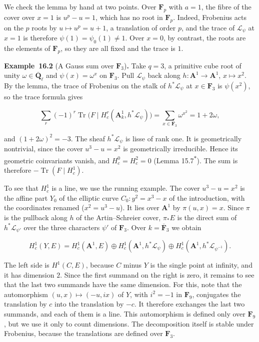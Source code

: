 \documentclass[11pt]{article}
\newenvironment{bpstatement}[2]{\par\addvspace{0.6\baselineskip}\noindent\textbf{#1}#2\textbf{.}\enspace\ignorespaces}
  {\par\addvspace{0.4\baselineskip}}
\newcommand{\bpout}[1]{#1\textsuperscript{\hyperlink{bp-outside}{\ensuremath{\ast}}}}
\begin{document}
\label{bp7}%
We check the lemma by hand at two points. Over \(\mathbf F_p\) with \(a=1\), the fibre of the cover over \(x=1\) is \(u^p-u=1\), which has no root in \(\mathbf F_p\). Indeed, Frobenius acts on the \(p\) roots by \(u\mapsto u^p=u+1\), a translation of order \(p\), and the trace of \(\mathcal L_\psi\) at \(x=1\) is therefore \(\psi(1)=\psi_0(1)\ne1\). Over \(x=0\), by contrast, the roots are the elements of \(\mathbf F_p\), so they are all fixed and the trace is \(1\).

\label{bp8}%
\begin{bpstatement}{Example~16.2}{ (A Gauss sum over $\mathbf F_3$)}
Take \(q=3\), a primitive cube root of unity \(\omega\in\overline{\mathbf Q}_\ell\) and \(\psi(x)=\omega^x\) on \(\mathbf F_3\). Pull \(\mathcal L_\psi\) back along \(h:\mathbf A^1\to\mathbf A^1\), \(x\mapsto x^2\). By the lemma, the trace of Frobenius on the stalk of \(h^*\mathcal L_\psi\) at \(x\in\mathbf F_3\) is \(\psi(x^2)\), so the trace formula gives

\[
\sum_r(-1)^r\operatorname{Tr}\bigl(F\mid H^r_c(\mathbf A^1_k,h^*\mathcal L_\psi)\bigr)
=\sum_{x\in\mathbf F_3}\omega^{x^2}=1+2\omega ,
\]

and \((1+2\omega)^2=-3\). The sheaf \(h^*\mathcal L_\psi\) is lisse of rank one. It is geometrically nontrivial, since the cover \(u^3-u=x^2\) is geometrically irreducible. Hence its geometric coinvariants vanish, and \(H^0_c=H^2_c=0\) (Lemma \bpout{15.7}). The sum is therefore \(-\operatorname{Tr}(F\mid H^1_c)\).

To see that \(H^1_c\) is a line, we use the running example. The cover \(u^3-u=x^2\) is the affine part \(Y_0\) of the elliptic curve \(C_0\colon y^2=x^3-x\) of the introduction, with the coordinates renamed (\(x^2=u^3-u\)). It lies over \(\mathbf A^1\) by \(\pi(u,x)=x\). Since \(\pi\) is the pullback along \(h\) of the Artin–Schreier cover, \(\pi_*E\) is the direct sum of \(h^*\mathcal L_{\psi'}\) over the three characters \(\psi'\) of \(\mathbf F_3\). Over \(k=\overline{\mathbf F}_3\) we obtain

\[
H^1_c(Y,E)=H^1_c(\mathbf A^1,E)\oplus H^1_c(\mathbf A^1,h^*\mathcal L_\psi)
\oplus H^1_c(\mathbf A^1,h^*\mathcal L_{\psi^{-1}}).
\]

The left side is \(H^1(C,E)\), because \(C\) minus \(Y\) is the single point at infinity, and it has dimension \(2\). Since the first summand on the right is zero, it remains to see that the last two summands have the same dimension. For this, note that the automorphism \((u,x)\mapsto(-u,ix)\) of \(Y\), with \(i^2=-1\) in \(\mathbf F_9\), conjugates the translation by \(c\) into the translation by \(-c\). It therefore exchanges the last two summands, and each of them is a line. This automorphism is defined only over \(\mathbf F_9\), but we use it only to count dimensions. The decomposition itself is stable under Frobenius, because the translations are defined over \(\mathbf F_3\).


\end{bpstatement}
\end{document}
